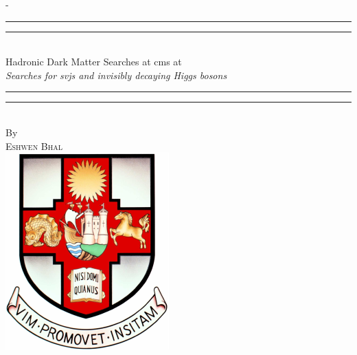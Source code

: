 %
%
% 
%
%
\begin{titlingpage}
\begin{SingleSpace}
\calccentering{\unitlength} 
\begin{adjustwidth*}{\unitlength}{-\unitlength}
\vspace*{13mm}
\begin{center}
\rule[0.5ex]{\linewidth}{2pt}\vspace*{-\baselineskip}\vspace*{3.2pt}
\rule[0.5ex]{\linewidth}{1pt}\\[\baselineskip]
{\HUGE Hadronic Dark Matter Searches at \acrshort{cms} at \comruntwo}\\[4mm] %
{\Large \textit{Searches for \glspl{svj} and invisibly decaying Higgs bosons}}\\ %
\rule[0.5ex]{\linewidth}{1pt}\vspace*{-\baselineskip}\vspace{3.2pt}
\rule[0.5ex]{\linewidth}{2pt}\\
\vspace{6.5mm}
{\large By}\\
\vspace{6.5mm}
{\large\textsc{Eshwen Bhal}}\\  %
\vspace{11mm}
\includegraphics[scale=0.6]{logos/bristolcrest_colour}\\  %

\end{center}
\end{adjustwidth*}
\end{SingleSpace}
\end{titlingpage}
